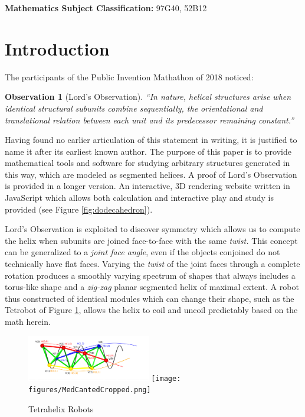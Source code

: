\documentclass{svproc}
\newtheorem{observation}{Observation}
\begin{document}
\makeatletter
\newcommand{\subjclass}[1]{%
    \small
    \textbf{Mathematics Subject Classification:} #1}


\makeatother

\subjclass{ 97G40, 52B12}

\section{Introduction}

The participants of the Public Invention Mathathon of 2018\cite{read2019mathathon} noticed:
\begin{observation}[Lord's Observation]
  “In nature, helical structures arise when identical structural subunits combine sequentially, the orientational and translational relation between each unit and its predecessor remaining constant.”\cite{lord2002helical}
  \label{obs:lords}
\end{observation}
Having found no earlier articulation of this statement
in writing, it is justified to name it after its earliest known author.
The purpose of this paper is to provide mathematical
tools and software for studying arbitrary
structures generated in this way, which are modeled as segmented helices.
A proof of Lord's Observation is provided in a longer version\cite{readfullsegmentedhelix}.
An interactive, 3D rendering website written in JavaScript which allows both calculation and
interactive play and study is provided\cite{segmentedhelixinteractive}
(see Figure \ref{fig:dodecahedron}).

Lord's Observation is exploited to discover symmetry which allows us to compute the helix when subunits are joined face-to-face with
the same {\em twist.}
This concept can be generalized to a {\em joint face angle}, even if the
objects conjoined do not technically have flat faces.
Varying the {\em twist} of the joint faces through a complete rotation produces a smoothly varying
spectrum of shapes that always includes a torus-like shape and a
{\em zig-zag} planar segmented helix of maximal extent.
A robot thus constructed of identical modules which can change their shape, such as the Tetrobot of Figure \ref{fig:tetrahelices}, allows the helix to coil and uncoil
predictably based on the math herein.

\begin{figure}
  \centering

{\includegraphics[width=0.48\textwidth]{figures/UnifiedDrawing.png}}
{\texttt{[image: figures/MedCantedCropped.png]}}
\caption{Tetrahelix Robots}\label{fig:tetrahelices}
\end{figure}
\end{document}
